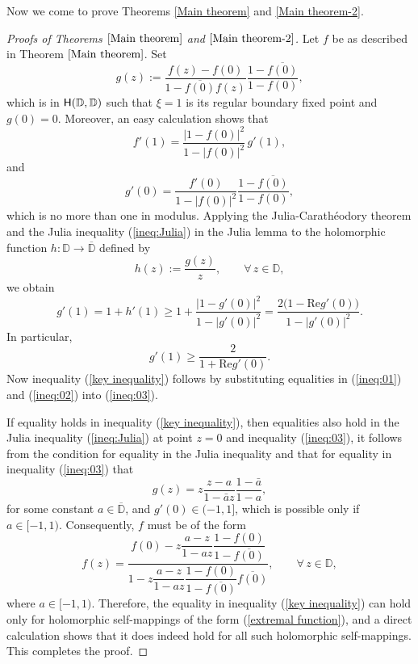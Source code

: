 \documentclass{amsart}
\theoremstyle{definition}
\theoremstyle{remark}
\numberwithin{equation}{section}
\begin{document}
\bigskip
Now we come to prove Theorems \ref{Main theorem} and   \ref{Main theorem-2}.
\begin{proof}[Proofs of Theorems $\ref{Main theorem}$ and  $\ref{Main theorem-2}$]
Let $f$ be as described in Theorem $\ref{Main theorem}$. Set
$$g(z):=\frac{f(z)-f(0)}{1-\overline{f(0)}f(z)}\frac{1-\overline{f(0)}}{1-f(0)},$$ which is in ${\rm{\textsf{H}}}(\mathbb D, \mathbb D)$ such that $\xi=1$ is its regular  boundary  fixed  point and $g(0)=0$. Moreover, an easy calculation shows that
\begin{equation}\label{ineq:01}
f'(1)=\frac{|1-f(0)|^2}{1-|f(0)|^2}\,g'(1),
\end{equation}
and
\begin{equation}\label{ineq:02}
g'(0)=\frac{f'(0)}{1-|f(0)|^2}\frac{1-\overline{f(0)}}{1-f(0)},
\end{equation}
which is no more than one in modulus.
Applying the Julia-Carath\'{e}odory theorem and the Julia inequality (\ref{ineq:Julia}) in the Julia lemma to the holomorphic function
  $h: \mathbb D\rightarrow \overline{\mathbb D}$
defined by
$$h(z
):=\dfrac{g(z)}{z},\qquad \forall\,z\in\mathbb D,$$
we obtain
\begin{equation}\label{derivative ineq}
g'(1)=1+h'(1)\geq 1+\frac{|1-g'(0)|^2}{1-|g'(0)|^2}=\frac{2\big(1-\textrm{Re}g'(0)\big)}{1-|g'(0)|^2}.
\end{equation}
In particular,
\begin{equation}\label{ineq:03}
  g'(1)\geq\frac{2}{1+\textrm{Re}g'(0)}.
\end{equation}
Now inequality  (\ref{key inequality}) follows by substituting equalities in (\ref{ineq:01}) and  (\ref{ineq:02}) into (\ref{ineq:03}).

If equality holds  in inequality (\ref{key inequality}), then equalities also hold in the Julia inequality (\ref{ineq:Julia}) at point $z=0$ and inequality (\ref{ineq:03}), it follows from the condition for equality in the Julia inequality and that for equality in inequality (\ref{ineq:03}) that
 \begin{equation}\label{ineq:04}
 g(z)=z\frac{z-a}{1-\bar{a}z}\frac{1-\bar{a}}{1-a},
\end{equation}
for some constant $a\in\overline{\mathbb D}$, and $g'(0)\in(-1,1]$, which is possible only if $a\in [-1,1)$. Consequently, $f$ must be of the form
\begin{equation}\label{extremal function}
f(z)=\dfrac{f(0)-z\dfrac{a-z}{1-az}\dfrac{1-f(0)}{1-\overline{f(0)}}}{1-z\dfrac{a-z}{1-az}
\dfrac{1-f(0)}{1-\overline{f(0)}}\overline{f(0)}},\qquad \forall\,z\in\mathbb D,
\end{equation}
where $a\in [-1,1)$.
Therefore, the equality in inequality (\ref{key inequality}) can hold only for holomorphic self-mappings  of  the form (\ref{extremal function}), and a direct calculation shows that it does indeed hold for all such holomorphic self-mappings.
This completes the proof.
\end{proof}
\end{document}
